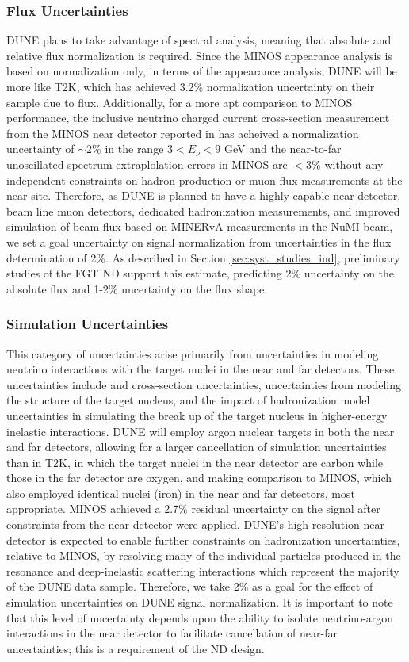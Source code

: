 \subsubsection{Flux Uncertainties}
\label{sec:syst_just_flux}
DUNE plans to take advantage of spectral analysis,
meaning that absolute and relative flux normalization is required. Since the MINOS \nue appearance analysis
is based on normalization only, in terms of the \nue appearance analysis, DUNE will be more like T2K,
which has achieved 3.2\% normalization uncertainty on their \nue sample due to flux. Additionally, for a more apt
comparison to MINOS performance, the inclusive neutrino charged current cross-section measurement from the MINOS
near detector reported in \cite{xxx} has acheived a normalization uncertainty of $\sim$2\% in the
range $3 < E_\nu < 9$ GeV and the near-to-far \numu unoscillated-spectrum extraplolation errors in MINOS
are $<$3\% without any independent constraints on hadron production or muon flux measurements at the near
site. Therefore, as DUNE is planned to have a highly capable near detector, beam line
muon detectors, dedicated hadronization measurements, and improved simulation of beam flux based on MINERvA
measurements in the NuMI beam, we set a goal uncertainty on \nue signal
normalization from uncertainties in the flux determination of 2\%.
As described in Section \ref{sec:syst_studies_ind}, preliminary
studies of the FGT ND support this estimate, predicting 2\% uncertainty on the absolute flux and 1-2\%
uncertainty on the flux shape.
\subsubsection{Simulation Uncertainties}
\label{sec:syst_just_sim}
This category of uncertainties arise primarily from uncertainties in modeling neutrino interactions with the target
nuclei in the near and far detectors. These uncertainties include \nue and \numu cross-section uncertainties,
uncertainties from modeling the structure of the target nucleus, and the impact of
hadronization model uncertainties in simulating the break up of the target nucleus in higher-energy inelastic
interactions. DUNE will employ argon nuclear targets in both the near and far detectors, allowing for a larger
cancellation of simulation uncertainties than in T2K, in which the target nuclei in the near detector are
carbon while those in the far detector are oxygen, and making comparison to MINOS, which also employed identical
nuclei (iron) in the near and far detectors, most appropriate. MINOS achieved a 2.7\% residual uncertainty on
the \nue signal after constraints from the near detector were applied. DUNE's high-resolution near
detector is expected to enable further constraints on hadronization uncertainties, relative to MINOS, by
resolving many of the individual particles produced in the resonance and deep-inelastic scattering interactions
which represent the majority of the DUNE data sample. Therefore, we take 2\% as a goal for the effect of
simulation uncertainties on DUNE \nue signal normalization. It is important to note that this level of
uncertainty depends upon the ability to isolate neutrino-argon interactions in the near detector to facilitate
cancellation of near-far uncertainties; this is a requirement of the ND design.

